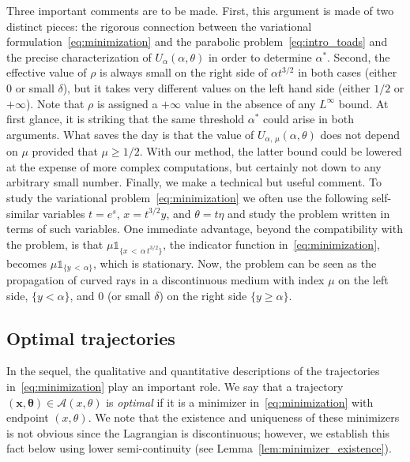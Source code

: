 \documentclass[AHL,Unicode,longabstracts]{cedram}
\newcommand{\bx}{\mathbf{x}}
\newcommand{\mA}{\mathcal{A}}
\newcommand{\btheta}{\boldsymbol{\theta}}
\newcommand{\1}{\mathds{1}}
\begin{document}
Three important comments are to be made. First, this argument is made of two distinct pieces: the rigorous connection between the variational formulation~\eqref{eq:minimization} and the parabolic problem~\eqref{eq:intro_toads} and the precise characterization of $U_\alpha(\alpha,\theta)$ in order to determine $\alpha^*$. Second, the effective value of $\rho$ is always small on the right side of $\alpha t^{3/2}$ in both cases (either 0 or small $\delta$), but it takes very different values on the left hand side (either $1/2$ or $+\infty$). Note that $\rho$ is assigned a $+\infty$ value in the absence of any $L^\infty$ bound. At first glance, it is striking that the same threshold $\alpha^*$ could arise in both arguments. What saves the day is that the value of $U_{\alpha,\,\mu}(\alpha,\theta)$ does not depend on $\mu$ provided that $\mu \geq 1/2$. With our method, the latter bound could be lowered at the expense of more complex computations, but certainly not down to any arbitrary small number. Finally, we make a technical but useful comment. To study the variational problem~\eqref{eq:minimization} we often use the following self-similar variables $t = e^s$, $x = t^{3/2} y$, and $\theta = t \eta$ and study the problem written in terms of such variables. One immediate advantage, beyond the compatibility with the problem, is that $\mu \1_{\{x\,<\,\alpha\,t^{3/2}\}}$, the indicator function in~\eqref{eq:minimization}, becomes $\mu \1_{\{y\,<\,\alpha\}}$, which is stationary. Now, the problem can be seen as the propagation of curved rays in a discontinuous medium with index $\mu$ on the left side, $\{y < \alpha\}$, and $0$ (or small $\delta$) on the right side $\{y\geq \alpha\}$.



\subsection*{Optimal trajectories}


In the sequel, the qualitative and quantitative descriptions of the trajectories in~\eqref{eq:minimization} play an important role. We say that a trajectory $(\bx,\btheta) \in \mA(x,\theta)$ is {\em optimal} if it is a minimizer in~\eqref{eq:minimization} with endpoint $(x,\theta)$. We note that the existence and uniqueness of these minimizers is not obvious since the Lagrangian is discontinuous; however, we establish this fact below using lower semi-continuity (see Lemma~\ref{lem:minimizer_existence}).
\end{document}
